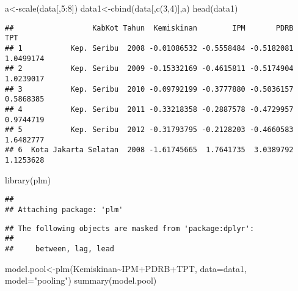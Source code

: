 \documentclass[
]{book}
\newenvironment{Shaded}{\begin{snugshade}}{\end{snugshade}}
\newcommand{\AttributeTok}[1]{\textcolor[rgb]{0.77,0.63,0.00}{#1}}
\newcommand{\DecValTok}[1]{\textcolor[rgb]{0.00,0.00,0.81}{#1}}
\newcommand{\FunctionTok}[1]{\textcolor[rgb]{0.00,0.00,0.00}{#1}}
\newcommand{\NormalTok}[1]{#1}
\newcommand{\OtherTok}[1]{\textcolor[rgb]{0.56,0.35,0.01}{#1}}
\newcommand{\SpecialCharTok}[1]{\textcolor[rgb]{0.00,0.00,0.00}{#1}}
\newcommand{\StringTok}[1]{\textcolor[rgb]{0.31,0.60,0.02}{#1}}
\begin{document}
\begin{Shaded}
\begin{Highlighting}[]
\NormalTok{a}\OtherTok{\textless{}{-}}\FunctionTok{scale}\NormalTok{(data[,}\DecValTok{5}\SpecialCharTok{:}\DecValTok{8}\NormalTok{]) }
\NormalTok{data1}\OtherTok{\textless{}{-}}\FunctionTok{cbind}\NormalTok{(data[,}\FunctionTok{c}\NormalTok{(}\DecValTok{3}\NormalTok{,}\DecValTok{4}\NormalTok{)],a)}
\FunctionTok{head}\NormalTok{(data1)}
\end{Highlighting}
\end{Shaded}

\begin{verbatim}
##                  KabKot Tahun  Kemiskinan        IPM       PDRB       TPT
## 1           Kep. Seribu  2008 -0.01086532 -0.5558484 -0.5182081 1.0499174
## 2           Kep. Seribu  2009 -0.15332169 -0.4615811 -0.5174904 1.0239017
## 3           Kep. Seribu  2010 -0.09792199 -0.3777880 -0.5036157 0.5868385
## 4           Kep. Seribu  2011 -0.33218358 -0.2887578 -0.4729957 0.9744719
## 5           Kep. Seribu  2012 -0.31793795 -0.2128203 -0.4660583 1.6482777
## 6  Kota Jakarta Selatan  2008 -1.61745665  1.7641735  3.0389792 1.1253628
\end{verbatim}

\begin{Shaded}
\begin{Highlighting}[]
\FunctionTok{library}\NormalTok{(plm)}
\end{Highlighting}
\end{Shaded}

\begin{verbatim}
## 
## Attaching package: 'plm'
\end{verbatim}

\begin{verbatim}
## The following objects are masked from 'package:dplyr':
## 
##     between, lag, lead
\end{verbatim}

\begin{Shaded}
\begin{Highlighting}[]
\NormalTok{model.pool}\OtherTok{\textless{}{-}}\FunctionTok{plm}\NormalTok{(Kemiskinan}\SpecialCharTok{\textasciitilde{}}\NormalTok{IPM}\SpecialCharTok{+}\NormalTok{PDRB}\SpecialCharTok{+}\NormalTok{TPT, }\AttributeTok{data=}\NormalTok{data1, }\AttributeTok{model=}\StringTok{"pooling"}\NormalTok{)}
\FunctionTok{summary}\NormalTok{(model.pool)}
\end{Highlighting}
\end{Shaded}
\end{document}
